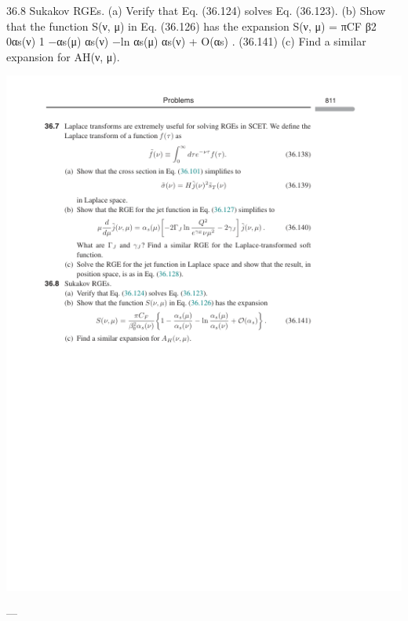 36.8 Sukakov RGEs.
(a) Verify that Eq. (36.124) solves Eq. (36.123).
(b) Show that the function S(ν, μ) in Eq. (36.126) has the expansion
S(ν, μ) =
πCF
β2
0αs(ν)
1 −αs(μ)
αs(ν) −ln αs(μ)
αs(ν) + O(αs)
.
(36.141)
(c) Find a similar expansion for AH(ν, μ).

\includegraphics{./figs/36_Jets_and_effective_field_theory_page_831.png}

---

